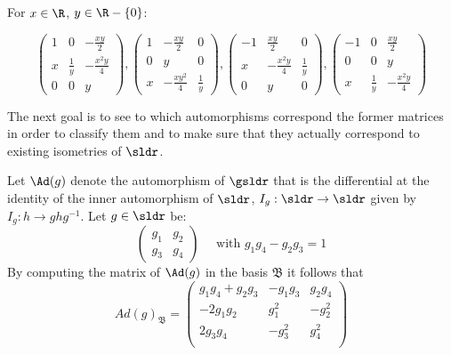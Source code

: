 \documentclass[11pt]{amsart}
\theoremstyle{plain}
\theoremstyle{definition}
\theoremstyle{remark}
\begin{document}
For $x \in \R$, $y \in \R-\{0\}$:
     
\begin{center}
\[    
    \begin{pmatrix}
    1 & 0 & -\frac{x y}{2}\\[6pt]
    x & \frac{1}{y} & -\frac{x^2 y}{4}\\[6pt]
    0 & 0 & y
    \end{pmatrix}
    ,    
    \begin{pmatrix}
    1 & -\frac{x y}{2} & 0\\[6pt]
    0 & y & 0\\[6pt]
    x & -\frac{x y^2}{4} & \frac{1}{y}
    \end{pmatrix}
    , 
    \begin{pmatrix}
    -1 & \frac{x y}{2} & 0\\[6pt]
    x & -\frac{x^2 y}{4} & \frac{1}{y}\\[6pt]
    0 & y & 0
    \end{pmatrix}
    ,
    \begin{pmatrix}
    -1 & 0 & \frac{x y}{2}\\[6pt]
    0 & 0 & y\\[6pt]
    x & \frac{1}{y} & -\frac{x^2 y}{4}
    \end{pmatrix}
    \]
\end{center}

The next goal is to see to which automorphisms correspond the former matrices in order to classify them and to make sure that they actually correspond to existing isometries of $\sldr$. 

Let $\Ad(g)$ denote the automorphism of $\gsldr$ that is the differential at the identity of the inner automorphism of $\sldr$, $I_g: \sldr \to \sldr$  given by $I_g: h \to g h g^{-1}$. Let $g \in \sldr$ be:
$$\left( \begin{matrix} g_1 & g_2 \\ g_3 &  g_4 \end{matrix} \right) \quad \mbox{ with } g_1 g_4 - g_2 g_3=1$$ By computing the matrix of $\Ad(g)$ in the basis $\mathfrak B$ it follows that
\[ Ad(g)_\mathfrak{B} = 
\left( {\begin{matrix}
   g_1g_4+g_2g_3 & -g_1g_3 & g_2g_4 \\
   -2g_1g_2 & g_1^2 & -g_2^2 \\
   2g_3g_4 & -g_3^2 & g_4^2 \\
  \end{matrix} } \right)
\]
\end{document}
